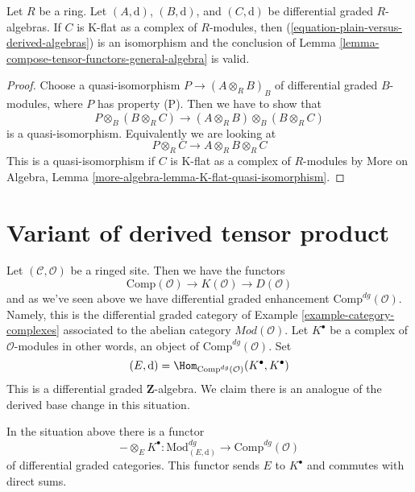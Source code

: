 \begin{lemma}
\label{lemma-compose-tensor-functors}
Let $R$ be a ring. Let $(A, \text{d})$, $(B, \text{d})$, and
$(C, \text{d})$ be differential graded $R$-algebras.
If $C$ is K-flat as a complex of $R$-modules, then
(\ref{equation-plain-versus-derived-algebras})
is an isomorphism and the conclusion of
Lemma \ref{lemma-compose-tensor-functors-general-algebra} is valid.
\end{lemma}

\begin{proof}
Choose a quasi-isomorphism $P \to (A \otimes_R B)_B$ of differential
graded $B$-modules, where $P$ has property (P). Then we have to show
that
$$
P \otimes_B (B \otimes_R C) \longrightarrow
(A \otimes_R B) \otimes_B (B \otimes_R C)
$$
is a quasi-isomorphism. Equivalently we are looking at
$$
P \otimes_R C \longrightarrow
A \otimes_R B \otimes_R C
$$
This is a quasi-isomorphism if $C$ is K-flat as a complex of $R$-modules by
More on Algebra, Lemma \ref{more-algebra-lemma-K-flat-quasi-isomorphism}.
\end{proof}





\section{Variant of derived tensor product}
\label{section-variant-base-change}

\noindent
Let $(\mathcal{C}, \mathcal{O})$ be a ringed site. Then we have the functors
$$
\text{Comp}(\mathcal{O}) \to K(\mathcal{O}) \to D(\mathcal{O})
$$
and as we've seen above we have differential graded enhancement
$\text{Comp}^{dg}(\mathcal{O})$. Namely, this is the differential
graded category of Example \ref{example-category-complexes} associated
to the abelian category $\textit{Mod}(\mathcal{O})$.
Let $K^\bullet$ be a complex of $\mathcal{O}$-modules in other
words, an object of $\text{Comp}^{dg}(\mathcal{O})$. Set
$$
(E, \text{d}) =
\Hom_{\text{Comp}^{dg}(\mathcal{O})}(K^\bullet, K^\bullet)
$$
This is a differential graded $\mathbf{Z}$-algebra. We claim there is
an analogue of the derived base change in this situation.

\begin{lemma}
\label{lemma-tensor-with-complex}
In the situation above there is a functor
$$
- \otimes_E K^\bullet :
\text{Mod}^{dg}_{(E, \text{d})}
\longrightarrow
\text{Comp}^{dg}(\mathcal{O})
$$
of differential graded categories. This functor sends $E$ to $K^\bullet$
and commutes with direct sums.
\end{lemma}

